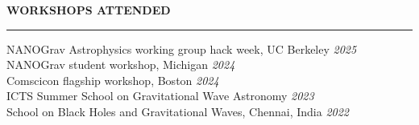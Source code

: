 \documentclass{resume} %
\renewenvironment{rSection}[1]{
\sectionskip
\textbf{\textcolor{C2}{\MakeUppercase{#1}}}
\sectionlineskip
\hrule
\begin{list}{}{
\setlength{\leftmargin}{1.5em}
}
\item[]
}{
\end{list}
}
\begin{document}
\begin{rSection}{Workshops Attended }
    {NANOGrav Astrophysics working group hack week, UC Berkeley} \hfill {\em 2025}\\
    {NANOGrav student workshop, Michigan} \hfill {\em 2024}\\
    {Comscicon flagship workshop, Boston} \hfill {\em 2024}\\
    {ICTS Summer School on Gravitational Wave Astronomy} \hfill {\em2023}\\
    {School on Black Holes and Gravitational Waves, Chennai, India} \hfill {\em 2022}\\
\end{rSection}
\end{document}
